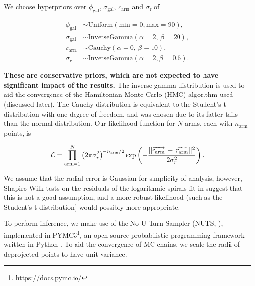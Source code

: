 We choose hyperpriors over $\phi_\mathrm{gal}$, $\sigma_\mathrm{gal}$, $c_\mathrm{arm}$ and $\sigma_\mathrm{r}$ of

\begin{align}
  \phi_\mathrm{gal} &\sim \mathrm{Uniform}(\mathrm{min}=0, \mathrm{max}=90),\\
  \sigma_\mathrm{gal} &\sim \mathrm{InverseGamma}(\alpha=2,\,\beta=20),\\
  c_\mathrm{arm} &\sim \mathrm{Cauchy}(\alpha=0,\,\beta=10),\\
  \sigma_r &\sim \mathrm{InverseGamma}(\alpha=2, \beta=0.5).
\end{align}

\textbf{These are conservative priors, which are not expected to have significant impact of the results.} The inverse gamma distribution is used to aid the convergence of the Hamiltonian Monte Carlo (HMC) algorithm used (discussed later). The Cauchy distribution is equivalent to the Student's t-distribution with one degree of freedom, and was chosen due to its fatter tails than the normal distribution. Our likelihood function for $N$ arms, each with $n_\mathrm{arm}$ points, is

\begin{equation}
  \mathcal{L} = \prod_{\mathrm{arm}=1}^{N}\left(2\pi\sigma_r^2\right)^{-n_\mathrm{arm}/2}
  \exp\left(-\frac{||\overrightarrow{r_\mathrm{arm}}\,-\,\widetilde{r_\mathrm{arm}}||^2}{2\sigma_r^2}\right).
\end{equation}

We assume that the radial error is Gaussian for simplicity of analysis, however, Shapiro-Wilk tests on the residuals of the logarithmic spirals fit in \citet{2020arXiv200610450L} suggest that this is not a good assumption, and a more robust likelihood (such as the Student's t-distribution) would possibly more appropriate.

To perform inference, we make use of the No-U-Turn-Sampler (NUTS, \citealt{2011arXiv1111.4246H}), implemented in PYMC3\footnote{\url{https://docs.pymc.io/}}, an open-source probabilistic programming framework written in Python \citep{pymc3_paper}. To aid the convergence of MC chains, we scale the radii of deprojected points to have unit variance.
